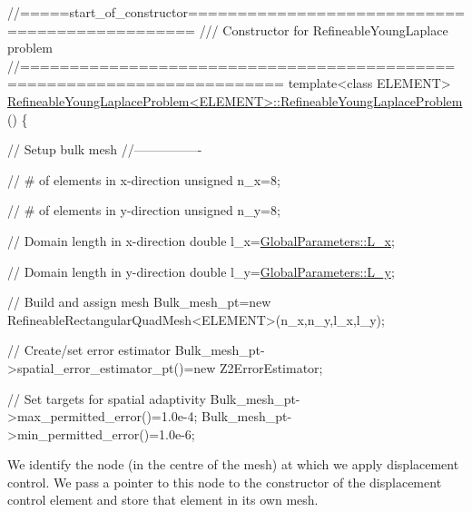 \begin{DoxyCodeInclude}
\textcolor{comment}{//=====start\_of\_constructor===============================================}
\textcolor{comment}{/// Constructor for RefineableYoungLaplace problem}
\textcolor{comment}{}\textcolor{comment}{//========================================================================}
\textcolor{keyword}{template}<\textcolor{keyword}{class} ELEMENT>
\hyperlink{classRefineableYoungLaplaceProblem_a78f77a299f2770a82378fcccf86a0b71}{RefineableYoungLaplaceProblem<ELEMENT>::RefineableYoungLaplaceProblem}
      ()
\{ 

 \textcolor{comment}{// Setup bulk mesh}
 \textcolor{comment}{//----------------}

 \textcolor{comment}{// # of elements in x-direction}
 \textcolor{keywordtype}{unsigned} n\_x=8;

 \textcolor{comment}{// # of elements in y-direction}
 \textcolor{keywordtype}{unsigned} n\_y=8;

 \textcolor{comment}{// Domain length in x-direction}
 \textcolor{keywordtype}{double} l\_x=\hyperlink{namespaceGlobalParameters_a36ebf514fdd1e78fff69907b39e25af6}{GlobalParameters::L\_x};

 \textcolor{comment}{// Domain length in y-direction}
 \textcolor{keywordtype}{double} l\_y=\hyperlink{namespaceGlobalParameters_ac8774b3418c4551091d64ec72c169b2e}{GlobalParameters::L\_y};
 
 \textcolor{comment}{// Build and assign mesh}
 Bulk\_mesh\_pt=\textcolor{keyword}{new} RefineableRectangularQuadMesh<ELEMENT>(n\_x,n\_y,l\_x,l\_y);

 \textcolor{comment}{// Create/set error estimator}
 Bulk\_mesh\_pt->spatial\_error\_estimator\_pt()=\textcolor{keyword}{new} Z2ErrorEstimator;

 \textcolor{comment}{// Set targets for spatial adaptivity}
 Bulk\_mesh\_pt->max\_permitted\_error()=1.0e-4;
 Bulk\_mesh\_pt->min\_permitted\_error()=1.0e-6;

\end{DoxyCodeInclude}


We identify the node (in the centre of the mesh) at which we apply displacement control. We pass a pointer to this node to the constructor of the displacement control element and store that element in its own mesh.


